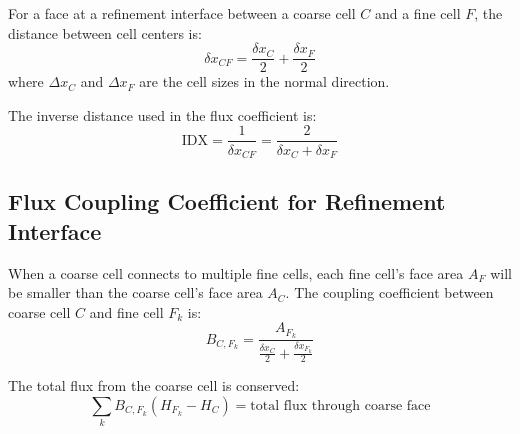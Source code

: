 For a face at a refinement interface between a coarse cell $C$ and a fine cell $F$, the distance between cell centers is:
\begin{equation}
    \delta x_{CF} = \frac{\delta x_C}{2} + \frac{\delta x_F}{2}
    \label{eq:interface_distance}
\end{equation}
where $\Delta x_C$ and $\Delta x_F$ are the cell sizes in the normal direction.

The inverse distance used in the flux coefficient is:
\begin{equation}
    \text{IDX} = \frac{1}{\delta x_{CF}} = \frac{2}{\delta x_C + \delta x_F}
    \label{eq:idx}
\end{equation}




\subsection*{Flux Coupling Coefficient for Refinement Interface}

When a coarse cell connects to multiple fine cells, each fine cell's face area $A_F$ will be smaller than the coarse cell's face area $A_C$.  The coupling coefficient between coarse cell $C$ and fine cell $F_k$ is:
\begin{equation}
    B_{C,F_k} = \frac{A_{F_k}}{\frac{\delta x_C}{2} + \frac{\delta x_{F_k}}{2}}
    \label{eq:refinement_coupling}
\end{equation}

The total flux from the coarse cell is conserved:
\begin{equation}
    \sum_{k} B_{C,F_k} (H_{F_k} - H_C) = \text{total flux through coarse face}
    \label{eq:flux_conservation}
\end{equation}

